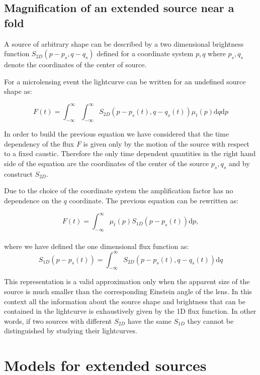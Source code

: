 \subsection{Magnification of an extended source near a fold}

A source of arbitrary shape can be described by a two dimensional brightness function $S_{2D}(p - p_s, q - q_s)$ defined for a coordinate system $p,q$ where $p_s, q_s$ denote the coordinates of the center of source.

For a microlensing event the lightcurve can be written for an undefined source shape as:

\begin{equation}
 F(t) = \int_{-\infty}^\infty \int_{-\infty}^\infty S_{2D}(p-p_s(t), q-q_s(t)) \mu_t(p) \mathrm{d}q \mathrm{d}p
 \label{eqn:ft2d}
\end{equation}

In order to build the previous equation we have considered that the time dependency of the flux $F$ is given only by the motion of the source with respect to a fixed caustic. Therefore the only time dependent quantities in the right hand side of the equation
are the coordinates of the center of the source $p_s,q_s$ and by construct $S_{2D}$. 

Due to the choice of the coordinate system the amplification factor has no dependence on the $q$ coordinate. The previous equation can be rewritten as:

\begin{equation}
 F(t) 
= \int_{-\infty}^\infty  \mu_t(p) S_{1D}\left(p-p_s(t)\right) \mathrm{d}p,
\label{eqn:ft}
\end{equation}
\\
where we have defined the one dimensional flux function as:
\begin{equation}
 S_{1D}(p-p_s(t)) = \int_{-\infty}^\infty S_{2D}(p-p_s(t), q-q_s(t)) \mathrm{d}q
\end{equation}

This representation is a valid approximation only when the apparent size of the source is much smaller than the corresponding Einstein angle of the lens. In this context 
all the information about the source shape and brightness that can be contained in the lightcurve is exhaustively given by the 1D flux function.
In other words, if two sources with different $S_{2D}$ have the same $S_{1D}$ they cannot be distinguished by studying their lightcurves.
 
 
\section{Models for extended sources}

